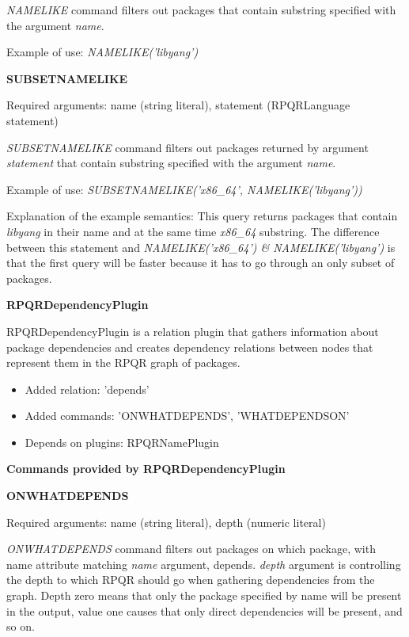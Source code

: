 \textit{NAMELIKE} command filters out packages that contain substring specified with the argument
\textit{name}.

Example of use: \textit{NAMELIKE('libyang')}

\newpage

\textbf{SUBSETNAMELIKE}

Required arguments: name (string literal), statement (RPQRLanguage statement)

\textit{SUBSETNAMELIKE} command filters out packages returned by argument \textit{statement} that
contain substring specified with the argument \textit{name}.

Example of use: \textit{SUBSETNAMELIKE('x86\_64', NAMELIKE('libyang'))}

Explanation of the example semantics: This query returns packages that contain \textit{libyang} in their
name and at the same time \textit{x86\_64} substring. The difference between this statement and
\textit{NAMELIKE('x86\_64') \& NAMELIKE('libyang')} is that the first query will be faster because
it has to go through an only subset of packages.

\textbf{RPQRDependencyPlugin}

RPQRDependencyPlugin is a relation plugin that gathers information about package dependencies and
creates dependency relations between nodes that represent them in the RPQR graph of packages.

\begin{itemize}
  \item Added relation: 'depends'
  \item Added commands: 'ONWHATDEPENDS', 'WHATDEPENDSON'
  \item Depends on plugins: RPQRNamePlugin
\end{itemize}

\textbf{Commands provided by RPQRDependencyPlugin}

\textbf{ONWHATDEPENDS}

Required arguments: name (string literal), depth (numeric literal)

\textit{ONWHATDEPENDS} command filters out packages on which package, with name attribute matching
\textit{name} argument, depends. \textit{depth} argument is controlling the depth to which RPQR
should go when gathering dependencies from the graph. Depth zero means that only the package specified
by name will be present in the output, value one causes that only direct dependencies will be present, and
so on.


